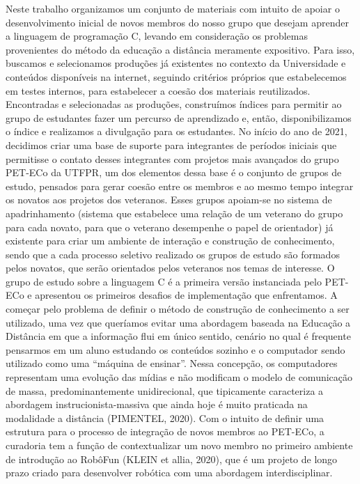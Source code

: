 Neste trabalho organizamos um conjunto de materiais com intuito de apoiar o desenvolvimento
inicial de novos membros do nosso grupo que desejam aprender a linguagem de programação C,
levando em consideração os problemas provenientes do método da educação a distância
meramente expositivo. Para isso, buscamos e selecionamos produções já existentes no contexto
da Universidade e conteúdos disponíveis na internet, seguindo critérios próprios que
estabelecemos em testes internos, para estabelecer a coesão dos materiais reutilizados.
Encontradas e selecionadas as produções, construímos índices para permitir ao grupo de
estudantes fazer um percurso de aprendizado e, então, disponibilizamos o índice e realizamos a
divulgação para os estudantes.
No início do ano de 2021, decidimos criar uma base de suporte para integrantes de períodos
iniciais que permitisse o contato desses integrantes com projetos mais avançados do grupo
PET-ECo da UTFPR, um dos elementos dessa base é o conjunto de grupos de estudo, pensados
para gerar coesão entre os membros e ao mesmo tempo integrar os novatos aos projetos dos
veteranos. Esses grupos apoiam-se no sistema de apadrinhamento (sistema que estabelece uma
relação de um veterano do grupo para cada novato, para que o veterano desempenhe o papel de
orientador) já existente para criar um ambiente de interação e construção de conhecimento,
sendo que a cada processo seletivo realizado os grupos de estudo são formados pelos novatos,
que serão orientados pelos veteranos nos temas de interesse.
O grupo de estudo sobre a linguagem C é a primeira versão instanciada pelo PET-ECo e
apresentou os primeiros desafios de implementação que enfrentamos. A começar pelo problema
de definir o método de construção de conhecimento a ser utilizado, uma vez que queríamos
evitar uma abordagem baseada na Educação a Distância em que a informação flui em único
sentido, cenário no qual é frequente pensarmos em um aluno estudando os conteúdos sozinho e o
computador sendo utilizado como uma “máquina de ensinar”. Nessa concepção, os
computadores representam uma evolução das mídias e não modificam o modelo de comunicação
de massa, predominantemente unidirecional, que tipicamente caracteriza a abordagem
instrucionista-massiva que ainda hoje é muito praticada na modalidade a distância (PIMENTEL,
2020).
Com o intuito de definir uma estrutura para o processo de integração de novos membros ao
PET-ECo, a curadoria tem a função de contextualizar um novo membro no primeiro ambiente de
introdução ao RobôFun (KLEIN et allia, 2020), que é um projeto de longo prazo criado para
desenvolver robótica com uma abordagem interdisciplinar.
